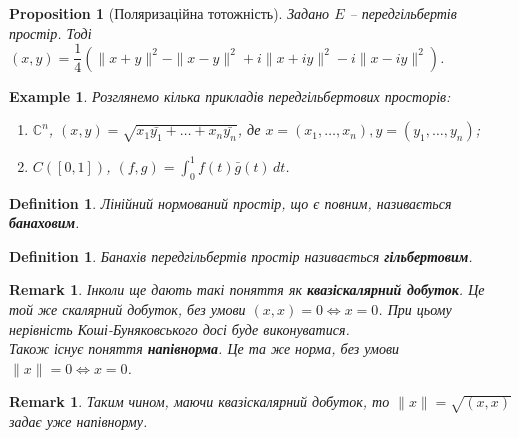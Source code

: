 \documentclass[a4paper, 10pt]{article}
\theoremstyle{theoremdd}
\newtheorem{definition}[theorem]{Definition}
\newtheorem{example}[theorem]{Example}
\newtheorem{proposition}[theorem]{Proposition}
\newtheorem{remark}[theorem]{Remark}
\begin{document}
\begin{proposition}[Поляризаційна тотожність]
Задано $E$ -- передгільбертів простір. Тоді\\
$(x,y) = \dfrac{1}{4} \left( \|x+y\|^2 - \|x-y\|^2 + i \|x+iy\|^2 - i \|x-iy\|^2 \right)$.
\end{proposition}

\begin{example}
Розглянемо кілька прикладів передгільбертових просторів:
\begin{enumerate}[nosep,wide=0pt,label={\arabic*)}]
\item $\mathbb{C}^n$, \qquad $(x,y) = \displaystyle\sqrt{x_1 \bar{y_1} + \dots + x_n \bar{y_n}}$, де $x = (x_1,\dots,x_n), y = (y_1,\dots,y_n)$;
\item $C([0,1])$, \qquad $(f,g) = \displaystyle\int_0^1 f(t)\bar{g}(t)\,dt$.
\end{enumerate}
\end{example}

\begin{definition}
Лінійний нормований простір, що є повним, називається \textbf{банаховим}.
\end{definition}

\begin{definition}
Банахів передгільбертів простір називається \textbf{гільбертовим}.
\end{definition}

\begin{remark}
Інколи ще дають такі поняття як \textbf{квазіскалярний добуток}. Це той же скалярний добуток, без умови $(x,x) = 0 \iff x = 0$. При цьому нерівність Коші-Буняковського досі буде виконуватися.\\
Також існує поняття \textbf{напівнорма}. Це та же норма, без умови $\|x\| = 0 \iff x = 0$.
\end{remark}

\begin{remark}
Таким чином, маючи квазіскалярний добуток, то $\|x\| = \sqrt{(x,x)}$ задає уже напівнорму.
\end{remark}
\end{document}
